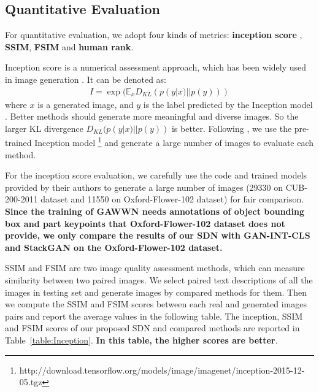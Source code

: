 \documentclass[sigconf]{acmart}
\begin{document}
\subsection{Quantitative Evaluation}  

For quantitative evaluation, we adopt four kinds of metrics: \textbf{inception score} \cite{salimans2016improved}, \textbf{SSIM}\cite{wang2004image}, \textbf{FSIM}\cite{zhang2011fsim} and \textbf{human rank}.

Inception score is a numerical assessment approach, which has been widely used in image generation \cite{salimans2016improved, huang2017stacked, gulrajani2017improved, berthelot2017began, ma2017pose}. It can be denoted as:
\begin{align}
	I = \exp(\mathbb{E}_xD_{KL}(p(y|x)||p(y)))
\end{align}
where $x$ is a generated image, and $y$ is the label predicted by the Inception model \cite{szegedy2016rethinking}. Better methods should generate more meaningful and diverse images. So the larger KL divergence $D_{KL}(p(y|x)||p(y))$ is better. Following \cite{salimans2016improved, huang2017stacked}, we use the pre-trained Inception model \footnote{http://download.tensorflow.org/models/image/imagenet/inception-2015-12-05.tgz} and generate a large number of images to evaluate each method.

For the inception score evaluation, we carefully use the code and trained models provided by their authors to generate a large number of images (29330 on CUB-200-2011 dataset and 11550 on Oxford-Flower-102 dataset) for fair comparison. \textbf{Since the training of GAWWN needs annotations of object bounding box and part keypoints that Oxford-Flower-102 dataset does not provide, we only compare the results of our SDN with GAN-INT-CLS and StackGAN on the Oxford-Flower-102 dataset.} 

SSIM and FSIM are two image quality assessment methods, which can measure similarity between two paired images. We select paired text descriptions of all the images in testing set and generate images by compared methods for them. Then we compute the SSIM and FSIM scores between each real and generated images pairs and report the average values in the following table. The inception, SSIM and FSIM scores of our proposed SDN and compared methods are reported in Table~\ref{table:Inception}. \textbf{In this table, the higher scores are better}.
\end{document}
